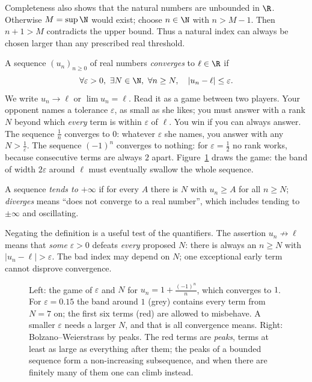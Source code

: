 Completeness also shows that the natural numbers are unbounded in $\R$.
Otherwise $M=\sup\N$ would exist; choose $n\in\N$ with $n>M-1$.
Then $n+1>M$ contradicts the upper bound. Thus a natural index can always
be chosen larger than any prescribed real threshold.

\begin{reminder}
A sequence $(u_n)_{n\ge0}$ of real numbers \emph{converges} to $\ell\in\R$ if
\[
\forall\varepsilon>0,\ \exists N\in\N,\ \forall n\ge N,\quad|u_n-\ell|\le\varepsilon.
\]
We write $u_n\to\ell$ or $\lim u_n=\ell$. Read it as a game between two players. Your opponent names a tolerance $\varepsilon$, as small as she
likes; you must answer with a rank $N$ beyond which \emph{every} term is within $\varepsilon$ of $\ell$. You win if you can always answer. The
sequence $\frac1n$ converges to $0$: whatever $\varepsilon$ she names, you answer with any $N>\frac1\varepsilon$. The sequence $(-1)^n$ converges to
nothing: for $\varepsilon=\frac12$ no rank works, because consecutive terms are always $2$ apart.
Figure~\ref{fig:epsilon} draws the game: the band of width $2\varepsilon$ around $\ell$ must eventually swallow the whole sequence.

A sequence \emph{tends to $+\infty$} if for every $A$ there is $N$ with $u_n\ge A$ for all $n\ge N$; \emph{diverges} means ``does not converge to a real
number'', which includes tending to $\pm\infty$ and oscillating.
\end{reminder}

Negating the definition is a useful test of the quantifiers. The assertion
$u_n\not\to\ell$ means that \emph{some} $\varepsilon>0$ defeats \emph{every}
proposed $N$: there is always an $n\ge N$ with $|u_n-\ell|>\varepsilon$.
The bad index may depend on $N$; one exceptional early term cannot disprove convergence.

\begin{figure}[ht]
\centering
{}
\caption{Left: the game of $\varepsilon$ and $N$ for $u_n=1+\frac{(-1)^n}{n}$, which converges to $1$. For $\varepsilon=0.15$ the band around $1$ (grey) contains every term from $N=7$ on; the first six terms (red) are allowed to misbehave. A smaller $\varepsilon$ needs a larger $N$, and that is all convergence means. Right: Bolzano--Weierstrass by peaks. The red terms are \emph{peaks}, terms at least as large as everything after them; the peaks of a bounded sequence form a non-increasing subsequence, and when there are finitely many of them one can climb instead.}
\label{fig:epsilon}
\end{figure}

